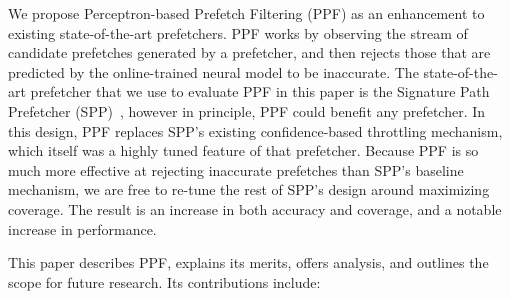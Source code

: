 We propose Perceptron-based Prefetch Filtering (PPF) as an enhancement to
existing state-of-the-art prefetchers.  PPF works by observing the stream of
candidate prefetches generated by a prefetcher, and then rejects those that
are predicted by the online-trained neural model to be inaccurate.
The state-of-the-art prefetcher that we 
use to evaluate PPF in this paper is the Signature Path Prefetcher 
(SPP)~\cite{SPP}, however in principle, PPF could benefit any prefetcher.
In this design, PPF replaces SPP's existing confidence-based throttling mechanism,
which itself was a highly tuned feature of that prefetcher.  Because PPF is
so much more effective at rejecting inaccurate prefetches than SPP's baseline
mechanism, we are free to re-tune the rest of SPP's design around maximizing
coverage.  The result is an increase in both accuracy and coverage, and
a notable increase in performance.


\vspace{1ex}This paper describes PPF, explains its merits, offers analysis, and
outlines the scope for future research. Its contributions include:

